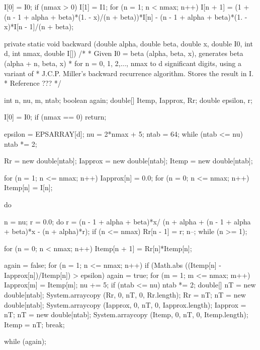 \begin{code}
\begin{hide}
{      I[0] = I0;
      if (nmax > 0)
         I[1] = I1;
      for (n = 1; n < nmax; n++)
         I[n + 1] = (1 + (n - 1 + alpha + beta)*(1. - x)/(n + beta))*I[n]
            - (n - 1 + alpha + beta)*(1. - x)*I[n - 1]/(n + beta);
   }

   private static void backward (double alpha, double beta, double x,
                                 double I0, int d, int nmax, double I[])
   /*
    * Given I0 = beta (alpha, beta, x), generates beta (alpha + n, beta, x)
    * for n = 0, 1, 2,..., nmax to d significant digits, using a variant of
    * J.C.P. Miller's backward recurrence algorithm. Stores the result in I.
    *  Reference ???
    */
   {
      int n, nu, m, ntab;
      boolean again;
      double[] Itemp, Iapprox, Rr;
      double epsilon, r;

      I[0] = I0;
      if (nmax == 0)
         return;

      epsilon = EPSARRAY[d];
      nu = 2*nmax + 5;
      ntab = 64;
      while (ntab <= nu)
         ntab *= 2;

      Rr = new double[ntab];
      Iapprox = new double[ntab];
      Itemp = new double[ntab];

      for (n = 1; n <= nmax; n++)
         Iapprox[n] = 0.0;
      for (n = 0; n <= nmax; n++)
         Itemp[n] = I[n];

      do {
         n = nu;
         r = 0.0;
         do {
            r = (n - 1 + alpha + beta)*x/
                (n + alpha + (n - 1 + alpha + beta)*x - (n + alpha)*r);
            if (n <= nmax)
               Rr[n - 1] = r;
            n--;
         } while (n >= 1);

         for (n = 0; n < nmax; n++)
            Itemp[n + 1] = Rr[n]*Itemp[n];

         again = false;
         for (n = 1; n <= nmax; n++) {
            if (Math.abs ((Itemp[n] - Iapprox[n])/Itemp[n]) > epsilon) {
               again = true;
               for (m = 1; m <= nmax; m++)
                  Iapprox[m] = Itemp[m];
               nu += 5;
               if (ntab <= nu) {
                  ntab *= 2;
                  double[] nT = new double[ntab];
                  System.arraycopy (Rr, 0, nT, 0, Rr.length);
                  Rr = nT;
                  nT = new double[ntab];
                  System.arraycopy (Iapprox, 0, nT, 0, Iapprox.length);
                  Iapprox = nT;
                  nT = new double[ntab];
                  System.arraycopy (Itemp, 0, nT, 0, Itemp.length);
                  Itemp = nT;
               }
               break;
            }
         }
      } while (again);

}
\end{hide}
\end{code}
